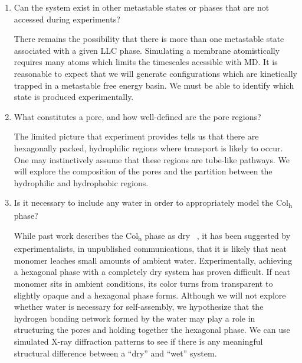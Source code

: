 \documentclass{article}
\begin{document}
\begin{enumerate}
  \item Can the system exist in other metastable states or phases that are not
  accessed during experiments? \label{point:metastable}
  
  There remains the possibility that there is more than one metastable state
  associated with a given LLC phase. Simulating a membrane atomistically
  requires many atoms which limits the timescales acessible with MD. It is
  reasonable to expect that we will generate configurations which are kinetically
  trapped in a metastable free energy basin. We must be able to identify which
  state is produced experimentally.

  \item What constitutes a pore, and how well-defined are the pore regions? \label{point:poredefinition}

  The limited picture that experiment provides tells us that there are
  hexagonally packed, hydrophilic regions where transport is likely to occur.
  One may instinctively assume that these regions are tube-like pathways. We will
  explore the composition of the pores and the partition between the
  hydrophilic and hydrophobic regions. 

  \item Is it necessary to include any water in order to appropriately model
  the Col\textsubscript{h} phase? \label{point:water}

  While past work describes the Col\textsubscript{h} phase as dry
  ~\cite{feng_scalable_2014}, it has been suggested by experimentalists, in
  unpublished communications, that it is likely that neat monomer leaches small
  amounts of ambient water.  Experimentally, achieving a hexagonal phase with a
  completely dry system has proven difficult. If neat monomer sits in ambient
  conditions, its color turns from transparent to slightly opaque and a hexagonal
  phase forms.  Although we will not explore whether water is necessary for
  self-assembly, we hypothesize that the hydrogen bonding network formed by the
  water may play a role in structuring the pores and holding together the
  hexagonal phase. We can use simulated X-ray diffraction patterns to see if
  there is any meaningful structural difference between a ``dry'' and ``wet''
  system.

  \end{enumerate}
  
 
\end{document}
